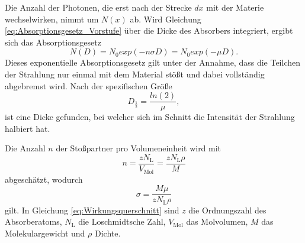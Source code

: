 Die Anzahl der Photonen, die erst nach der Strecke $dx$ mit der Materie wechselwirken, nimmt um $N(x)$ ab. 
Wird Gleichung \eqref{eq:Absorptionsgesetz_Vorstufe} über die Dicke des Absorbers integriert, ergibt sich das Absorptionsgesetz
\begin{equation}
	N(D)=N_0 exp(-n \sigma D)=N_0 exp(-\mu D).
	\label{eq:Absorptionsgesetz}
\end{equation}
Dieses exponentielle Absorptionsgesetz gilt unter der Annahme, dass die Teilchen der Strahlung nur einmal mit dem Material stößt und dabei vollständig abgebremst wird.
Nach der spezifischen Größe
\begin{equation}
	D_\frac{1}{2}=\frac{ln(2)}{\mu},
\end{equation}
ist eine Dicke gefunden, bei welcher sich im Schnitt die Intensität der Strahlung halbiert hat.

Die Anzahl $n$ der Stoßpartner pro Volumeneinheit wird mit
\begin{equation}
	n=\frac{zN_\text{L}}{V_\text{Mol}}=\frac{zN_\text{L}\rho}{M}
\end{equation}
abgeschätzt, wodurch 
\begin{equation}
	\sigma=\frac{M\mu}{zN_\text{L}\rho}
	\label{eq:Wirkungsquerschnitt}
\end{equation}
gilt.
In Gleichung \ref{eq:Wirkungsquerschnitt} sind $z$ die Ordnungszahl des Absorberatoms, $N_\text{L}$ die Loschmidtsche Zahl, $V_\text{Mol}$ das Molvolumen, $M$ das Molekulargewicht und $\rho$ Dichte.



